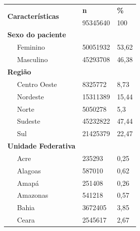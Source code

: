 \begin{table}[!htbp]
    \centering
    \begin{tabular}{llll}
    \hline
    \multicolumn{2}{l}{\multirow{2}{*}{\textbf{Características}}} & \textbf{n} & \textbf{\%} \\ \cline{3-4} 
    \multicolumn{2}{l}{}                                          & 95345640   & 100         \\ \hline
    \multicolumn{2}{l}{\textbf{Sexo do paciente}}                 &            &             \\
                         & Feminino                               & 50051932   & 53,62       \\
                         & Masculino                              & 45293708   & 46,38       \\
    \multicolumn{2}{l}{\textbf{Região}}                           &            &             \\
                         & Centro Oeste                           & 8325772    & 8,73        \\
                         & Nordeste                               & 15311389   & 15,44       \\
                         & Norte                                  & 5050278    & 5,3         \\
                         & Sudeste                                & 45232822   & 47,44       \\
                         & Sul                                    & 21425379   & 22,47       \\
    \multicolumn{2}{l}{\textbf{Unidade Federativa}}               &            &             \\
                         & Acre                                   & 235293     & 0,25        \\
                         & Alagoas                                & 587010     & 0,62        \\
                         & Amapá                                  & 251408     & 0,26        \\
                         & Amazonas                               & 541218     & 0,57        \\
                         & Bahia                                  & 3672405    & 3,85        \\
                         & Ceara                                  & 2545617    & 2,67        \\

\end{tabular}
\end{table}
